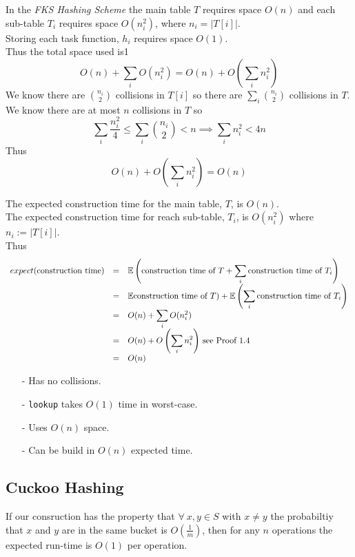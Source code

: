 \documentclass[11pt,a4paper]{article}
\begin{document}
In the \textit{FKS Hashing Scheme} the main table $T$ requires space $O(n)$ and each sub-table $T_i$ requires space $O(n_i^2)$, where $n_i=|T[i]|$.\\
Storing each task function, $h_i$ requires space $O(1)$.\\
Thus the total space used is1
$$O(n)+\sum_iO(n_i^2)=O(n)+O\left(\sum_in_i^2\right)$$
We know there are ${n_i\choose 2}$ collisions in $T[i]$ so there are $\sum_i{n_i\choose 2}$ collisions in $T$.\\
We know there are at most $n$ collisions in $T$ so
$$\sum_i\frac{n_i^2}{4}\leq\sum_i{n_i\choose2}<n\implies\sum_in_i^2<4n$$
Thus
$$O(n)+O\left(\sum_in_i^2\right)=O(n)$$

The expected construction time for the main table, $T$, is $O(n)$.\\
The expected construction time for reach sub-table, $T_i$, is $O(n_i^2)$ where $n_i:=|T[i]|$.\\
Thus
\[\begin{array}{rcl}
expect(\text{construction time})&=&{\displaystyle\mathbb{E}\left(\text{construction time of }T+\sum_i\text{construction time of }T_i\right)}\\
&=&\mathbb{E}\text{construction time of }T)+{\displaystyle\mathbb{E}\left(\sum_i\text{construction time of }T_i\right)}\\
&=&O(n)+{\displaystyle\sum_iO(n_i^2)}\\
&=&O(n)+{\displaystyle O\left(\sum_in_i^2\right)}\text{ see Proof 1.4}\\
&=&O(n)
\end{array}\]

\begin{itemize}
	\item[-] Has no collisions.
	\item[-] \lstinline!lookup! takes $O(1)$ time in worst-case.
	\item[-] Uses $O(n)$ space.
	\item[-] Can be build in $O(n)$ expected time.
\end{itemize}

\subsection{Cuckoo Hashing}

\remark{}
If our consruction has the property that $\forall\ x,y\in S$ with $x\neq y$ the probabiltiy that $x$ and $y$ are in the same bucket is $O\left(\frac1m\right)$, then for any $n$ operations the expected run-time is $O(1)$ per operation.\\
\end{document}
